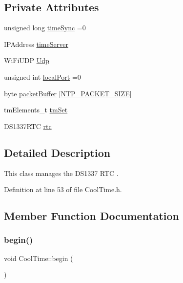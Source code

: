 \subsection*{Private Attributes}
\begin{DoxyCompactItemize}
\item 
unsigned long \hyperlink{class_cool_time_a9d032e76c3470a15b3bbbc52af6463f7}{time\+Sync} =0
\item 
I\+P\+Address \hyperlink{class_cool_time_ad2b9858f399108cb440dd1e908916f04}{time\+Server}
\item 
Wi\+Fi\+U\+DP \hyperlink{class_cool_time_a4e23216a8121ca79d0fb019f30884b92}{Udp}
\item 
unsigned int \hyperlink{class_cool_time_a2f777da44d7ba678be8185299e9b49d1}{local\+Port} =0
\item 
byte \hyperlink{class_cool_time_a27e6abc82a5c2f72161956967005bec7}{packet\+Buffer} \mbox{[}\hyperlink{_cool_time_8h_a56a6ea64006651b4f42adf713e244f06}{N\+T\+P\+\_\+\+P\+A\+C\+K\+E\+T\+\_\+\+S\+I\+ZE}\mbox{]}
\item 
tm\+Elements\+\_\+t \hyperlink{class_cool_time_ad33c2713c903ff064ad09c46406ae088}{tm\+Set}
\item 
D\+S1337\+R\+TC \hyperlink{class_cool_time_abd38f2384ff90692b1568d9db869412e}{rtc}
\end{DoxyCompactItemize}


\subsection{Detailed Description}
This class manages the D\+S1337 R\+TC . 

Definition at line 53 of file Cool\+Time.\+h.



\subsection{Member Function Documentation}
\mbox{\label{class_cool_time_ab1976cf718b950bc31e003c3323b8adb}} 
\subsubsection{\texorpdfstring{begin()}{begin()}}
{\footnotesize\ttfamily void Cool\+Time\+::begin (\begin{DoxyParamCaption}{ }\end{DoxyParamCaption})}

